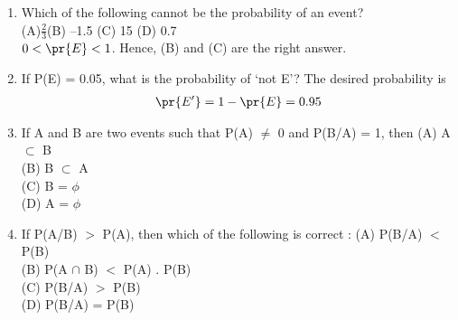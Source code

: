 
\renewcommand{\theequation}{\theenumi}
\begin{enumerate}[label=\thesection.\arabic*.,ref=\thesection.\theenumi]

\item Which of the following cannot be the probability of an event?\\
(A)$\frac{2}{3}$(B) –1.5 (C) 15 (D) 0.7
\\
\solution $0 < \pr{E} < 1$.  Hence, (B) and (C) are the right answer.
\item If P(E) = 0.05, what is the probability of ‘not E’?
%
\solution 
The desired probability is
\begin{align}
\pr{E^{\prime}} = 1 - \pr{E} = 0.95
\end{align}
%
\item If A and B are two events such that P(A) $\neq$ 0 and P(B/A) = 1, then
(A) A $\subset$ B \\
(B) B $\subset$ A \\
(C) B = $\phi$ \\
(D) A = $\phi$\\
\solution


\item If P(A/B) $>$ P(A), then which of the following is correct :
(A) P(B/A) $<$ P(B) \\
(B) P(A $\cap$ B) $<$ P(A) . P(B)\\
(C) P(B/A) $>$ P(B) \\
(D) P(B/A) = P(B)
\solution



\end{enumerate}
